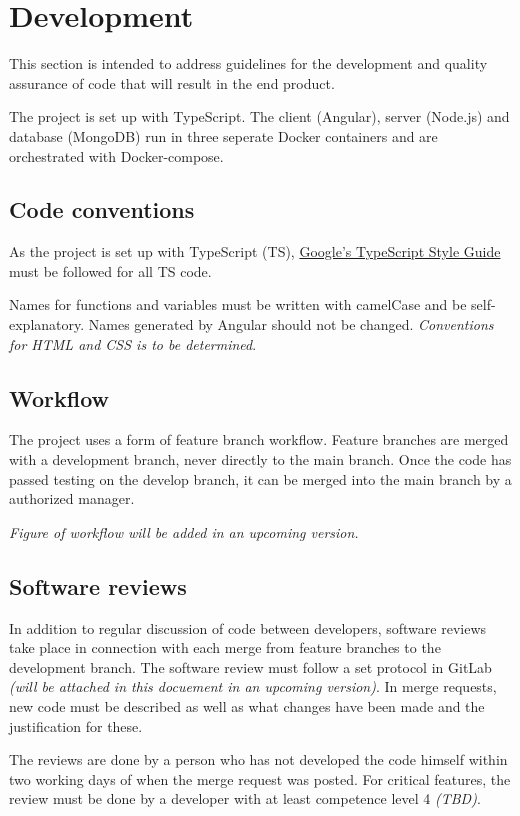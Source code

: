 \section{Development}
This section is intended to address guidelines for the development and quality assurance of code that will result in the end product.

The project is set up with TypeScript. The client (Angular), server (Node.js) and database (MongoDB) run in three seperate Docker containers and are orchestrated with Docker-compose.

\subsection{Code conventions}
As the project is set up with TypeScript (TS), \href{https://google.github.io/styleguide/tsguide.html}{Google's TypeScript Style Guide} must be followed for all TS code.

Names for functions and variables must be written with camelCase and be self-explanatory. Names generated by Angular should not be changed. \emph{Conventions for HTML and CSS is to be determined}.

\subsection{Workflow}
The project uses a form of feature branch workflow. Feature branches are merged with a development branch, never directly to the main branch. Once the code has passed testing on the develop branch, it can be merged into the main branch by a authorized manager.

\emph{Figure of workflow will be added in an upcoming version.}

\subsection{Software reviews}
In addition to regular discussion of code between developers, software reviews take place in connection with each merge from feature branches to the development branch. The software review must follow a set protocol in GitLab \emph{(will be attached in this docuement in an upcoming version)}. In merge requests, new code must be described as well as what changes have been made and the justification for these.

The reviews are done by a person who has not developed the code himself within two working days of when the merge request was posted. For critical features, the review must be done by a developer with at least competence level 4 \emph{(TBD)}.

